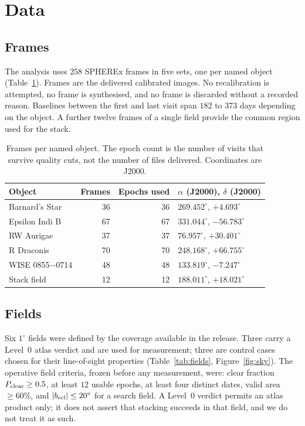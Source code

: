 \documentclass[11pt,a4paper]{article}
\begin{document}
\section{Data}\label{sec:data}

\subsection{Frames}
The analysis uses $258$ SPHEREx frames in five sets, one per named object
(Table~\ref{tab:frames}). Frames are the delivered calibrated images. No
recalibration is attempted, no frame is synthesised, and no frame is discarded
without a recorded reason. Baselines between the first and last visit span $182$
to $373$ days depending on the object. A further twelve frames of a single field
provide the common region used for the stack.

\begin{table}[htbp]
\centering
\small
\caption{Frames per named object. The epoch count is the number of visits that
survive quality cuts, not the number of files delivered. Coordinates are J2000.}
\label{tab:frames}
\begin{tabular}{lrrl}
\toprule
Object & Frames & Epochs used & $\alpha$ (J2000), $\delta$ (J2000) \\
\midrule
Barnard's Star   & 36 & 36 & $269.452^{\circ}$, $+4.693^{\circ}$ \\
Epsilon Indi B   & 67 & 67 & $331.044^{\circ}$, $-56.783^{\circ}$ \\
RW Aurigae       & 37 & 37 & $76.957^{\circ}$, $+30.401^{\circ}$ \\
R Draconis       & 70 & 70 & $248.168^{\circ}$, $+66.755^{\circ}$ \\
WISE 0855$-$0714 & 48 & 48 & $133.819^{\circ}$, $-7.247^{\circ}$ \\
\midrule
Stack field      & 12 & 12 & $188.011^{\circ}$, $+18.021^{\circ}$ \\
\bottomrule
\end{tabular}
\end{table}

\subsection{Fields}
Six $1^{\circ}$ fields were defined by the coverage available in the release.
Three carry a Level~0 atlas verdict and are used for measurement; three are
control cases chosen for their line-of-sight properties
(Table~\ref{tab:fields}, Figure~\ref{fig:sky}). The operative field criteria,
frozen before any measurement, were: clear fraction $P_{\rm clear}\ge 0.5$, at
least $12$ usable epochs, at least four distinct dates, valid area $\ge 60\%$, and
$|b_{\rm ecl}|\le 20^{\circ}$ for a search field. A Level~0 verdict permits an
atlas product only; it does not assert that stacking succeeds in that field, and
we do not treat it as such.
\end{document}
